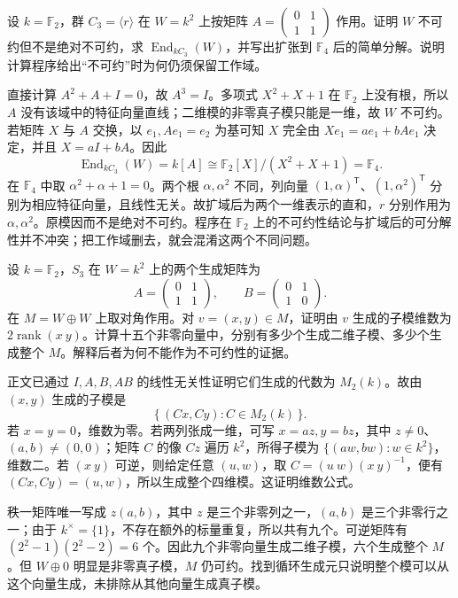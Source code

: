 \begin{optionalexercise}\label{b5:ex:08-finite-field-absolute-test}
	设 \(k=\mathbb F_2\)，群 \(C_3=\langle r\rangle\) 在 \(W=k^2\) 上按矩阵 \(A=\left(\begin{smallmatrix}0&1\\1&1\end{smallmatrix}\right)\) 作用。证明 \(W\) 不可约但不是绝对不可约，求 \(\operatorname{End}_{kC_3}(W)\)，并写出扩张到 \(\mathbb F_4\) 后的简单分解。说明计算程序给出“不可约”时为何仍须保留工作域。
\end{optionalexercise}
\begin{solution}
	直接计算 \(A^2+A+I=0\)，故 \(A^3=I\)。多项式 \(X^2+X+1\) 在 \(\mathbb F_2\) 上没有根，所以 \(A\) 没有该域中的特征向量直线；二维模的非零真子模只能是一维，故 \(W\) 不可约。若矩阵 \(X\) 与 \(A\) 交换，以 \(e_1,Ae_1=e_2\) 为基可知 \(X\) 完全由 \(Xe_1=a e_1+bAe_1\) 决定，并且 \(X=aI+bA\)。因此
	\[
		\operatorname{End}_{kC_3}(W)=k[A]
		\cong\mathbb F_2[X]/(X^2+X+1)=\mathbb F_4.
	\]
	在 \(\mathbb F_4\) 中取 \(\alpha^2+\alpha+1=0\)。两个根 \(\alpha,\alpha^2\) 不同，列向量 \((1,\alpha)^{\mathsf T}\)、\((1,\alpha^2)^{\mathsf T}\) 分别为相应特征向量，且线性无关。故扩域后为两个一维表示的直和，\(r\) 分别作用为 \(\alpha,\alpha^2\)。原模因而不是绝对不可约。程序在 \(\mathbb F_2\) 上的不可约性结论与扩域后的可分解性并不冲突；把工作域删去，就会混淆这两个不同问题。
\end{solution}

\begin{optionalexercise}\label{b5:ex:08-spin-up-cyclic-vectors}
	设 \(k=\mathbb F_2\)，\(S_3\) 在 \(W=k^2\) 上的两个生成矩阵为
	\[
		A=\begin{pmatrix}0&1\\1&1\end{pmatrix},\qquad
		B=\begin{pmatrix}0&1\\1&0\end{pmatrix}.
	\]
	在 \(M=W\oplus W\) 上取对角作用。对 \(v=(x,y)\in M\)，证明由 \(v\) 生成的子模维数为 \(2\operatorname{rank}(x\ y)\)。计算十五个非零向量中，分别有多少个生成二维子模、多少个生成整个 \(M\)。解释后者为何不能作为不可约性的证据。
\end{optionalexercise}
\begin{solution}
	正文已通过 \(I,A,B,AB\) 的线性无关性证明它们生成的代数为 \(M_2(k)\)。故由 \((x,y)\) 生成的子模是
	\[
		\{\,(Cx,Cy):C\in M_2(k)\,\}.
	\]
	若 \(x=y=0\)，维数为零。若两列张成一维，可写 \(x=a z,y=b z\)，其中 \(z\ne0\)、\((a,b)\ne(0,0)\)；矩阵 \(C\) 的像 \(Cz\) 遍历 \(k^2\)，所得子模为 \(\{(aw,bw):w\in k^2\}\)，维数二。若 \((x\ y)\) 可逆，则给定任意 \((u,w)\)，取 \(C=(u\ w)(x\ y)^{-1}\)，便有 \((Cx,Cy)=(u,w)\)，所以生成整个四维模。这证明维数公式。

	秩一矩阵唯一写成 \(z(a,b)\)，其中 \(z\) 是三个非零列之一，\((a,b)\) 是三个非零行之一；由于 \(k^\times=\{1\}\)，不存在额外的标量重复，所以共有九个。可逆矩阵有 \((2^2-1)(2^2-2)=6\) 个。因此九个非零向量生成二维子模，六个生成整个 \(M\)。但 \(W\oplus0\) 明显是非零真子模，\(M\) 仍可约。找到循环生成元只说明整个模可以从这个向量生成，未排除从其他向量生成真子模。
\end{solution}

